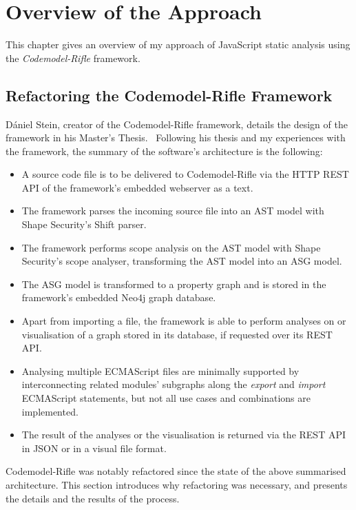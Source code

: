 \chapter{Overview of the Approach}
\label{chapter:overview}

This chapter gives an overview of my approach of JavaScript static analysis using the \emph{Codemodel-Rifle} framework.


\section{Refactoring the Codemodel-Rifle Framework}

Dániel Stein, creator of the Codemodel-Rifle framework, details the design of the framework in his Master's Thesis.~\cite{stein-daniel-msc} Following his thesis and my experiences with the framework, the summary of the software's architecture is the following:

\begin{itemize}
\item A source code file is to be delivered to Codemodel-Rifle via the HTTP REST API of the framework's embedded webserver as a text.
\item The framework parses the incoming source file into an AST model with Shape Security's Shift parser.
\item The framework performs scope analysis on the AST model with Shape Security's scope analyser, transforming the AST model into an ASG model.
\item The ASG model is transformed to a property graph and is stored in the framework's embedded Neo4j graph database.
\item Apart from importing a file, the framework is able to perform analyses on or visualisation of a graph stored in its database, if requested over its REST API.
\item Analysing multiple ECMAScript files are minimally supported by interconnecting related modules' subgraphs along the \emph{export} and \emph{import} ECMAScript statements, but not all use cases and combinations are implemented.
\item The result of the analyses or the visualisation is returned via the REST API in JSON or in a visual file format.
\end{itemize}

Codemodel-Rifle was notably refactored since the state of the above summarised architecture. This section introduces why refactoring was necessary, and presents the details and the results of the process.


